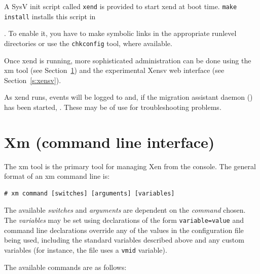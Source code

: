 \documentclass[11pt,twoside,final,openright]{report}
\def\xend{{xend}\xspace}
\begin{document}
A SysV init script called {\tt xend} is provided to start \xend at boot
time.  {\tt make install} installs this script in {.
To enable it, you have to make symbolic links in the appropriate
runlevel directories or use the {\tt chkconfig} tool, where available.

Once \xend is running, more sophisticated administration can be done
using the xm tool (see Section~\ref{s:xm}) and the experimental
Xensv web interface (see Section~\ref{s:xensv}).

As \xend runs, events will be logged to  and, 
if the migration assistant daemon () has been started, 
. These may be of use for troubleshooting
problems.

\section{Xm (command line interface)}
\label{s:xm}

The xm tool is the primary tool for managing Xen from the console.
The general format of an xm command line is:

\begin{verbatim}
# xm command [switches] [arguments] [variables]
\end{verbatim}

The available {\em switches} and {\em arguments} are dependent on the
{\em command} chosen.  The {\em variables} may be set using
declarations of the form {\tt variable=value} and command line
declarations override any of the values in the configuration file
being used, including the standard variables described above and any
custom variables (for instance, the  file uses a
{\tt vmid} variable).

The available commands are as follows:

}
\end{document}
